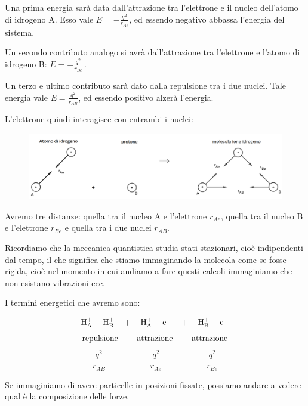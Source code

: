 Una prima energia sarà data dall'attrazione tra l'elettrone e il nucleo dell'atomo di idrogeno A. Esso vale $E=-\frac{q^2}{r_{Ae}}$, ed essendo negativo abbassa l'energia del sistema.

Un secondo contributo analogo si avrà dall'attrazione tra l'elettrone e l'atomo di idrogeno B: $E=-\frac{q^2}{r_{Be}}$\,.

Un terzo e ultimo contributo sarà dato dalla repulsione tra i due nuclei. Tale energia vale $E=\frac{q^2}{r_{AB}}$, ed essendo positivo alzerà l'energia.

\vspace{0.2cm}L'elettrone quindi interagisce con entrambi i nuclei:
\begin{figure}[htp]
    \centering
    \includegraphics[width=14cm]{immagini/interazione_elettrone_con_protoni.png}
\end{figure}

Avremo tre distanze: quella tra il nucleo A e l'elettrone $r_{Ae}$, quella tra il nucleo B e l'elettrone $r_{Be}$ e quella tra i due nuclei $r_{AB}$.

Ricordiamo che la meccanica quantistica studia stati stazionari, cioè indipendenti dal tempo, il che significa che stiamo immaginando la molecola come se fosse rigida, cioè nel momento in cui andiamo a fare questi calcoli immaginiamo che non esistano vibrazioni ecc.

I termini energetici che avremo sono:
\newpage

$$\rm H_A^+ - \hspace{0.2mm} H_B^+ \quad + \quad H_A^+ - \hspace{0.2mm} e^- \quad \hspace{-0.2mm}+\hspace{0.2mm} \quad H_B^+ - \hspace{0.2mm}e^-$$
$$\text{repulsione \qquad attrazione \qquad attrazione}$$
$$\frac{q^2}{r_{AB}} \qquad - \qquad \frac{q^2}{r_{Ae}} \qquad - \qquad \frac{q^2}{r_{Be}}$$

Se immaginiamo di avere particelle in posizioni fissate, possiamo andare a vedere qual è la composizione delle forze.

